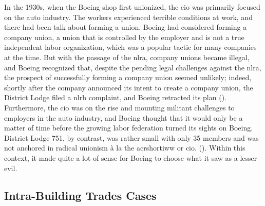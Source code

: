 \documentclass[12pt]{article}
\begin{document}
In the 1930s, when the Boeing shop first unionized, the \acrshort{cio} was primarily focused on the auto industry. The workers experienced terrible conditions at work, and there had been talk about forming a union. Boeing had considered forming a company union, a union that is controlled by the employer and is not a true independent labor organization, which was a popular tactic for many companies at the time. But with the passage of the \acrshort{nlra}, company unions became illegal, and Boeing recognized that, despite the pending legal challenges against the \acrshort{nlra}, the prospect of successfully forming a company union seemed unlikely; indeed, shortly after the company announced its intent to create a company union, the District Lodge filed a \acrshort{nlrb} complaint, and Boeing retracted its plan (\cite[23-24]{mccannBloodWaterHistory1989}). Furthermore, the \acrshort{cio} was on the rise and mounting militant challenges to employers in the auto industry, and Boeing thought that it would only be a matter of time before the growing labor federation turned its sights on Boeing. District Lodge 751, by contrast, was rather small with only 35 members and was not anchored in radical unionism \`{a} la the acrshort{iww} or \acrshort{cio}. (\cite[24]{mccannBloodWaterHistory1989}). Within this context, it made quite a lot of sense for Boeing to choose what it saw as a lesser evil.

\subsection{Intra-Building Trades Cases} \
\end{document}
